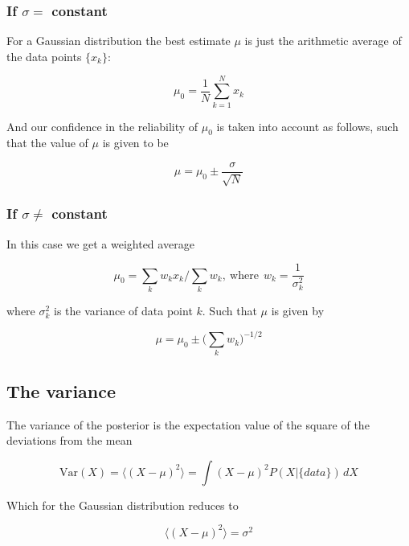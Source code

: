 \documentclass[a4paper]{article}
\begin{document}
\subsubsection*{If $\sigma=$ constant}

For a Gaussian distribution the best estimate $\mu$ is just the arithmetic average of the data points $\{x_k\}$:

\begin{equation}
	\mu_0=\frac{1}{N}\sum_{k=1}^{N}x_k
\end{equation}

And our confidence in the reliability of $\mu_0$ is taken into account as follows, such that the value of $\mu$ is given to be

\begin{equation}
	\mu = \mu_0\pm \frac{\sigma}{\sqrt{N}}
\end{equation}

\subsubsection*{If $\sigma\not=$ constant}

In this case we get a weighted average

\begin{equation}
	\mu_0=\sum_k w_kx_k \bigg/\sum_k w_k, \ \text{where} \ \ w_k=\frac{1}{\sigma_k^2}
\end{equation}

where $\sigma_k^2$ is the variance of data point $k$. Such that $\mu$ is given by

\begin{equation}
	\mu = \mu_0\pm \bigg(\sum_k w_k\bigg)^{-1/2}
\end{equation}

\subsection{The variance}

The variance of the posterior is the expectation value of the square of the deviations from the mean

\begin{equation}
	\text{Var}(X)=\big\langle (X-\mu)^2\big\rangle=\int (X-\mu)^2P(X|\{data\})\,dX
\end{equation}

Which for the Gaussian distribution reduces to

\begin{equation}
	\big\langle (X-\mu)^2\big\rangle=\sigma^2
\end{equation}
\end{document}

